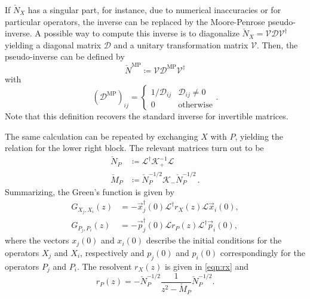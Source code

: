 \documentclass[
    reprint, 
    aps,
    preprintnumbers,
    twocolumn,
    prb,
    superscriptaddress
]{revtex4-2}
\newcommand{\bs}{\begin{subequations}}
\newcommand{\es}{\end{subequations}}
\begin{document}
If $\check{N}_X$ has a singular part, for instance, due to numerical inaccuracies or for particular operators, 
the inverse can be replaced by the Moore-Penrose pseudo-inverse. 
A possible way to compute this inverse is to diagonalize 
$\check{N}_X = \mathcal{V} \mathcal{D} \mathcal{V}^\dagger$ yielding a diagonal matrix $\mathcal{D}$ and a unitary transformation matrix $\mathcal{V}$. 
Then, the pseudo-inverse can be defined by
\begin{equation}
    \check{N}^{\mathrm{MP}} \coloneqq \mathcal{V} \mathcal{D}^{\mathrm{MP}} \mathcal{V}^\dagger
\end{equation}
with
\begin{equation}
    (\mathcal{D}^{\mathrm{MP}})_{ij} = \begin{cases}
        1/\mathcal{D}_{ij} & \mathcal{D}_{ij} \neq 0 \\ 0 & \text{otherwise}
    \end{cases}.
\end{equation}
Note that this definition recovers the standard inverse for invertible matrices.

The same calculation can be repeated by exchanging $X$ with $P$, yielding the relation for the lower right block.
The relevant matrices turn out to be 
\bs
\begin{align}
    \check{N}_P &\coloneqq \mathcal{L}^\dagger \mathcal{K}_+^{-1} \mathcal{L}
		\\
		\check{M}_P &\coloneqq \check{N}_P^{-1/2} \mathcal{K}_- \check{N}_P^{-1/2}\,.
\end{align}
\es
Summarizing, the Green's function is given by
\begin{subequations}
    \begin{align}
        G_{X_j,X_i}  (z) &= - \vec{x}_j^\dagger (0) \mathcal{L}^\dagger r_X (z) \mathcal{L} \vec{x}_i(0), 
				\\
        G_{P_j,P_i} (z) &= - \vec{p}_j^\dagger (0) \mathcal{L} r_P (z) \mathcal{L}^\dagger \vec{p}_i(0),
    \end{align}
\end{subequations}
where the vectors $x_j(0)$ and $x_i(0)$ describe the initial conditions for the operators
$X_j$ and $X_i$, respectively and $p_j(0)$ and $p_i(0)$ correspondingly for the operators
$P_j$ and $P_i$. The resolvent $r_X (z)$ is given in \eqref{eqn:rx} and 
\begin{equation}
    r_P (z) = -\check{N}_P^{-1/2} \frac{1}{z^2 - \check{M}_P} \check{N}_P^{-1/2} .
\end{equation}
\end{document}
